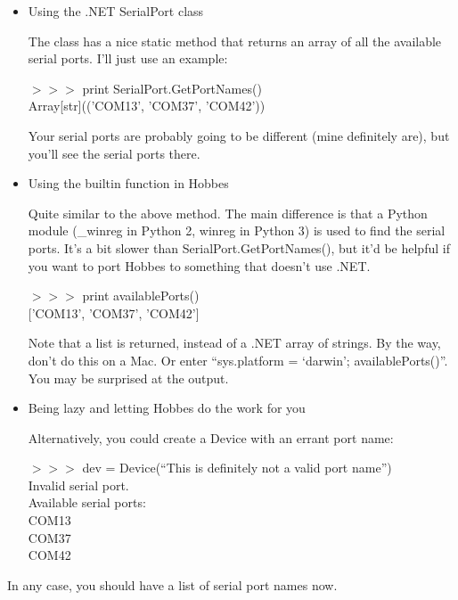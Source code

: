 \begin{itemize}
\item Using the .NET SerialPort class

The class has a nice static method that returns an array of all the available serial ports. I'll just use an example:

\vspace{6pt}
\noindent $>>>$ print SerialPort.GetPortNames() \\ Array[str](('COM13', 'COM37', 'COM42'))
\vspace{6pt}

Your serial ports are probably going to be different (mine definitely are), but you'll see the serial ports there.


\item Using the builtin function in Hobbes

Quite similar to the above method. The main difference is that a Python module (\_winreg in Python 2, winreg in Python 3) is used to find the serial ports. It's a bit slower than SerialPort.GetPortNames(), but it'd be helpful if you want to port Hobbes to something that doesn't use .NET.

\vspace{6pt}
\noindent $>>>$ print availablePorts() \\ $[$'COM13', 'COM37', 'COM42']
\vspace{6pt}

Note that a list is returned, instead of a .NET array of strings. By the way, don't do this on a Mac. Or enter ``sys.platform = `darwin'; availablePorts()''. You may be surprised at the output.


\item Being lazy and letting Hobbes do the work for you

Alternatively, you could create a Device with an errant port name:

\vspace{6pt}
\noindent $>>>$ dev = Device(``This is definitely not a valid port name'') \\ Invalid serial port. \\ Available serial ports: \\ COM13 \\ COM37 \\ COM42

\end{itemize}

In any case, you should have a list of serial port names now.



